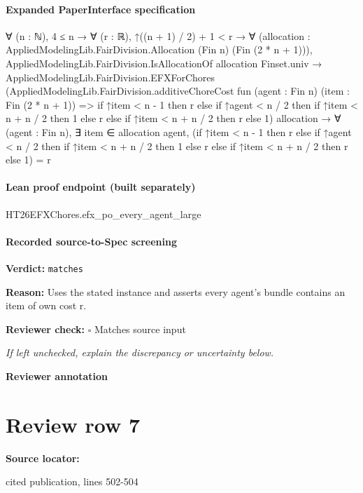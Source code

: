 \documentclass[10pt]{article}
\newcommand{\reviewerbox}{%
  \par\noindent\fbox{\parbox{0.96\linewidth}{\rule{0pt}{0.38in}}}\par
}
\newcommand{\reviewmatch}[1]{%
  \par\noindent\textbf{Reviewer check:} $\square$\; #1\par
  \noindent\emph{If left unchecked, explain the discrepancy or uncertainty below.}\par
}
\begin{document}
\paragraph{Expanded PaperInterface specification}
\begin{ReviewVerbatim}
∀ (n : ℕ),
  4 ≤ n →
    ∀ (r : ℝ),
      ↑((n + 1) / 2) + 1 < r →
        ∀ (allocation : AppliedModelingLib.FairDivision.Allocation (Fin n) (Fin (2 * n + 1))),
          AppliedModelingLib.FairDivision.IsAllocationOf allocation Finset.univ →
            AppliedModelingLib.FairDivision.EFXForChores
                (AppliedModelingLib.FairDivision.additiveChoreCost fun (agent : Fin n) (item : Fin (2 * n + 1)) =>
                  if ↑item < n - 1 then r
                  else
                    if ↑agent < n / 2 then if ↑item < n + n / 2 then 1 else r else if ↑item < n + n / 2 then r else 1)
                allocation →
              ∀ (agent : Fin n),
                ∃ item ∈ allocation agent,
                  (if ↑item < n - 1 then r
                    else
                      if ↑agent < n / 2 then if ↑item < n + n / 2 then 1 else r
                      else if ↑item < n + n / 2 then r else 1) =
                    r
\end{ReviewVerbatim}



\paragraph{Lean proof endpoint (built separately)}\begin{ReviewVerbatim}
HT26EFXChores.efx_po_every_agent_large
\end{ReviewVerbatim}

\paragraph{Recorded source-to-Spec screening}
\textbf{Verdict:} \texttt{matches}
\\
{\raggedright
\textbf{Reason:} Uses the stated instance and asserts every agent's bundle contains an item of own cost r.\allowbreak{}
\par}
\reviewmatch{Matches source input}
\noindent\textbf{Reviewer annotation}\par
\reviewerbox
\clearpage
\hypertarget{source-claim-8a3c68dd9df286a5}{}
\section*{Review row 7}
\textbf{Source locator:} {\footnotesize\raggedright cited publication, lines 502-\allowbreak{}504\par}
\end{document}
